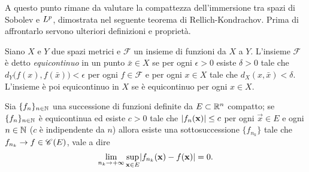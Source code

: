 A questo punto rimane da valutare la compattezza dell'immersione tra spazi di Sobolev e $\lclass[p]$, dimostrata nel seguente teorema di Rellich-Kondrachov.
Prima di affrontarlo servono ulteriori definizioni e proprietà.
\begin{definizione} \label{d:equicontinuita}
    Siano $X$ e $Y$ due spazi metrici e $\mathcal{F}$ un insieme di funzioni da $X$ a $Y$.
    L'insieme $\mathcal{F}$ è detto \emph{equicontinuo} in un punto $\bar{x}\in X$ se per ogni $\epsilon>0$ esiste $\delta>0$ tale che $d_Y\bigl(f(x),f(\bar{x})\bigr)<\epsilon$ per ogni $f\in\mathcal{F}$ e per ogni $x\in X$ tale che $d_X(x,\bar{x})<\delta$.
    L'insieme è poi equicontinuo in $X$ se è equicontinuo per ogni $x\in X$.
\end{definizione}
\begin{teorema} \label{t:ascoli-arzela}
    Sia $\{f_n\}_{n\in\N}$ una successione di funzioni definite da $E\subset\R^n$ compatto; se $\{f_n\}_{n\in\N}$ è equicontinua ed esiste $c>0$ tale che $\abs{f_n(\vec x)}\le c$ per ogni $\vec x\in E$ e ogni $n\in\N$ ($c$ è indipendente da $n$) allora esiste una sottosuccessione $\{f_{n_k}\}$ tale che $f_{n_k}\to f\in\cont{E}$, vale a dire
    \begin{equation}
        \lim_{n_k\to+\infty}\sup_{\vec x\in E}\abs{f_{n_k}(\vec x)-f(\vec x)}=0.
    \end{equation}
\end{teorema}
